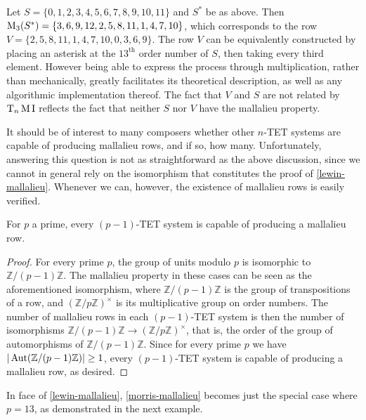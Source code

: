 \begin{example}
	Let $S = \{ 0, 1, 2, 3, 4, 5, 6, 7, 8, 9, 10, 11 \}$ and $S^*$ be as above. Then $\operatorname{M}_3(S^*) = \{ 3, 6, 9, 12, 2, 5, 8, 11, 1, 4, 7, 10 \}$, which corresponds to the row $V = \{ 2, 5, 8, 11, 1, 4, 7, 10, 0, 3, 6, 9 \}$. The row $V$ can be equivalently constructed by placing an asterisk at the $13^\text{th}$ order number of $S$, then taking every third element. However being able to express the process through multiplication, rather than mechanically, greatly facilitates its theoretical description, as well as any algorithmic implementation thereof. The fact that $V$ and $S$ are not related by $\operatorname{T}_n\operatorname{M}\operatorname{I}$ reflects the fact that neither $S$ nor $V$ have the mallalieu property.
\end{example}

It should be of interest to many composers whether other $n$-TET systems are capable of producing mallalieu rows, and if so, how many. Unfortunately, answering this question is not as straightforward as the above discussion, since we cannot in general rely on the isomorphism that constitutes the proof of \ref{lewin-mallalieu}. Whenever we can, however, the existence of mallalieu rows is easily verified.

\begin{proposition}
	\label{lewin-mallalieu}
	\cite[285]{Lewin1966}
	For $p$ a prime, every $(p - 1)$-TET system is capable of producing a mallalieu row.
	\begin{proof}
		For every prime $p$, the group of units modulo $p$ is isomorphic to $\mathbb{Z} / (p - 1) \mathbb{Z}$. The mallalieu property in these cases can be seen as the aforementioned isomorphism, where $\mathbb{Z} / (p - 1) \mathbb{Z}$ is the group of transpositions of a row, and $(\mathbb{Z} / p \mathbb{Z})^\times$ is its multiplicative group on order numbers. The number of mallalieu rows in each $(p - 1)$-TET system is then the number of isomorphisms $\mathbb{Z} / (p - 1) \mathbb{Z} \to (\mathbb{Z} / p \mathbb{Z})^\times$, that is, the order of the group of automorphisms of $\mathbb{Z} / (p - 1) \mathbb{Z}$. Since for every prime $p$ we have $|\operatorname{Aut}(\mathbb{Z} / (p - 1) \mathbb{Z})| \geq 1$, every $(p - 1)$-TET system is capable of producing a mallalieu row, as desired.
	\end{proof}
\end{proposition}

In face of \ref{lewin-mallalieu}, \ref{morris-mallalieu} becomes just the special case where $p = 13$, as demonstrated in the next example.

